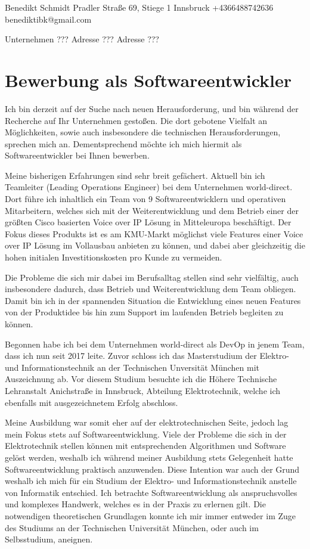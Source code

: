 \documentclass[12pt]{article}
\begin{document}
Benedikt Schmidt
Pradler Straße 69, Stiege 1
Innsbruck
+4366488742636
benediktibk@gmail.com

Unternehmen ???
Adresse ???
Adresse ???

\section{Bewerbung als Softwareentwickler}
Ich bin derzeit auf der Suche nach neuen Herausforderung, und bin während der Recherche auf Ihr Unternehmen gestoßen. Die dort gebotene Vielfalt an Möglichkeiten, sowie auch insbesondere die technischen Herausforderungen, sprechen mich an. Dementsprechend möchte ich mich hiermit als Softwareentwickler bei Ihnen bewerben. \par
Meine bisherigen Erfahrungen sind sehr breit gefächert. Aktuell bin ich Teamleiter (Leading Operations Engineer) bei dem Unternehmen world-direct. Dort führe ich inhaltlich ein Team von 9 Softwareentwicklern und operativen Mitarbeitern, welches sich mit der Weiterentwicklung und dem Betrieb einer der größten Cisco basierten Voice over IP Lösung in Mitteleuropa beschäftigt. Der Fokus dieses Produkts ist es am KMU-Markt möglichst viele Features einer Voice over IP Lösung im Vollausbau anbieten zu können, und dabei aber gleichzeitig die hohen initialen Investitionskosten pro Kunde zu vermeiden. \par
Die Probleme die sich mir dabei im Berufsalltag stellen sind sehr vielfältig, auch insbesondere dadurch, dass Betrieb und Weiterentwicklung dem Team obliegen. Damit bin ich in der spannenden Situation die Entwicklung eines neuen Features von der Produktidee bis hin zum Support im laufenden Betrieb begleiten zu können. \par
Begonnen habe ich bei dem Unternehmen world-direct als DevOp in jenem Team, dass ich nun seit 2017 leite. Zuvor schloss ich das Masterstudium der Elektro- und Informationstechnik an der Technischen Unversität München mit Auszeichnung ab. Vor diesem Studium besuchte ich die Höhere Technische Lehranstalt Anichstraße in Innsbruck, Abteilung Elektrotechnik, welche ich ebenfalls mit ausgezeichnetem Erfolg abschloss. \par
Meine Ausbildung war somit eher auf der elektrotechnischen Seite, jedoch lag mein Fokus stets auf Softwareentwicklung. Viele der Probleme die sich in der Elektrotechnik stellen können mit entsprechenden Algorithmen und Software gelöst werden, weshalb ich während meiner Ausbildung stets Gelegenheit hatte Softwareentwicklung praktisch anzuwenden. Diese Intention war auch der Grund weshalb ich mich für ein Studium der Elektro- und Informationstechnik anstelle von Informatik entschied. Ich betrachte Softwareentwicklung als anspruchsvolles und komplexes Handwerk, welches es in der Praxis zu erlernen gilt. Die notwendigen theoretischen Grundlagen konnte ich mir immer entweder im Zuge des Studiums an der Technischen Universität München, oder auch im Selbsstudium, aneignen. \par
\end{document}
